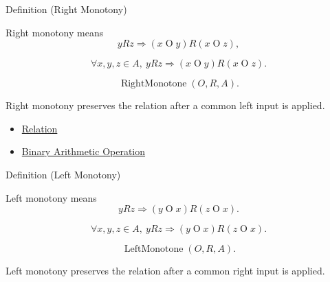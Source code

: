 \begin{definitionbox}{Definition (Right Monotony)}
\begin{definition}
\label{def:right-monotony}
Right monotony means
\[
yRz \Longrightarrow (x\mathbin{O}y)R(x\mathbin{O}z),
\]
\end{definition}
\end{definitionbox}

\begin{remark*}
\[
\forall x,y,z\in A,\ yRz \Longrightarrow (x\mathbin{O}y)R(x\mathbin{O}z).
\]
\end{remark*}

\begin{remark*}
\[
\operatorname{RightMonotone}(O,R,A).
\]
\end{remark*}

\begin{remark*}[Interpretation]
Right monotony preserves the relation after a common left input is applied.
\end{remark*}

\begin{dependencies}
\begin{itemize}
  \item \hyperref[def:relation]{Relation}
  \item \hyperref[def:binary-arithmetic-operation]{Binary Arithmetic Operation}
\end{itemize}
\end{dependencies}

\begin{definitionbox}{Definition (Left Monotony)}
\begin{definition}
\label{def:left-monotony}
Left monotony means
\[
yRz \Longrightarrow (y\mathbin{O}x)R(z\mathbin{O}x).
\]
\end{definition}
\end{definitionbox}

\begin{remark*}
\[
\forall x,y,z\in A,\ yRz \Longrightarrow (y\mathbin{O}x)R(z\mathbin{O}x).
\]
\end{remark*}

\begin{remark*}
\[
\operatorname{LeftMonotone}(O,R,A).
\]
\end{remark*}

\begin{remark*}[Interpretation]
Left monotony preserves the relation after a common right input is applied.
\end{remark*}

